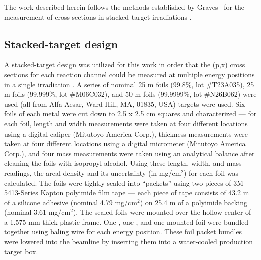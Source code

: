 The work described herein follows the  methods established by Graves \etal\ for the measurement of cross sections in stacked target irradiations   \cite{Graves2016}.



\subsection{Stacked-target design }\label{sec:target_design}


A stacked-target design was utilized for this work in order that the (p,x) cross sections for each reaction channel could be measured at multiple energy positions in a single irradiation \cite{Cumming1963}. 
A series of nominal 25 \mmicro m  foils (99.8\%, lot \#T23A035), 25 \mmicro m  foils (99.999\%, lot \#M06C032), and 50 \mmicro m  foils (99.9999\%, lot \#N26B062) were used (all from Alfa Aesar, Ward Hill, MA, 01835, USA) targets were used.
Six foils of each metal were cut down to 2.5 x 2.5 cm squares and characterized --- for each foil, length and width measurements were taken at four different locations using a digital caliper (Mitutoyo America Corp.), thickness measurements were taken at four different locations using a digital micrometer (Mitutoyo America Corp.), and four mass measurements were taken using an analytical balance after cleaning the foils with isopropyl alcohol.
Using these length, width, and mass readings, the areal density and its uncertainty (in mg/cm$^2$) for each foil was calculated.
The foils were tightly sealed into \enquote{packets} using two pieces of  3M 5413-Series Kapton polyimide film tape --- each piece of tape consists of 43.2 \mmicro m of a silicone adhesive (nominal 4.79 mg/cm$^2$) on 25.4 \mmicro m of a polyimide backing (nominal 3.61 mg/cm$^2$).
The sealed foils were mounted over the hollow center of a 1.575 mm-thick plastic frame.
One , one , and one  mounted foil were bundled together using baling wire for each energy position.
These foil packet bundles were lowered into the beamline by inserting them into a  water-cooled production target box.
